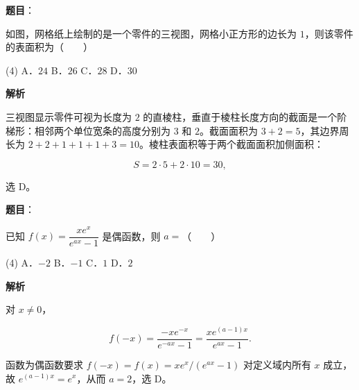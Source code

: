 \begin{answer}

\textbf{题目}：

如图，网格纸上绘制的是一个零件的三视图，网格小正方形的边长为 $1$，则该零件的表面积为\mbox{（　　）}
\nopagebreak[4]
\begin{center}\end{center}
\nopagebreak[4]
\begin{gkopts}(4)
\task A．$24$
\task B．$26$
\task C．$28$
\task D．$30$
\end{gkopts}

\textbf{解析}

三视图显示零件可视为长度为 $2$ 的直棱柱，垂直于棱柱长度方向的截面是一个阶梯形：相邻两个单位宽条的高度分别为 $3$ 和 $2$。截面面积为 $3+2=5$，其边界周长为 $2+2+1+1+1+3=10$。棱柱表面积等于两个截面面积加侧面积：

\nopagebreak[4]
\[
S=2\cdot5+2\cdot10=30,
\]

选 D。


\end{answer}
\begin{answer}

\textbf{题目}：

已知 $f(x)=\dfrac{xe^x}{e^{ax}-1}$ 是偶函数，则 $a=$\mbox{（　　）}

\begin{gkopts}(4)
\task A．$-2$
\task B．$-1$
\task C．$1$
\task D．$2$
\end{gkopts}

\textbf{解析}

对 $x\ne0$，

\nopagebreak[4]
\[
f(-x)=\frac{-xe^{-x}}{e^{-ax}-1}
=\frac{xe^{(a-1)x}}{e^{ax}-1}.
\]

函数为偶函数要求 $f(-x)=f(x)=xe^x/(e^{ax}-1)$ 对定义域内所有 $x$ 成立，故 $e^{(a-1)x}=e^x$，从而 $a=2$，选 D。


\end{answer}
